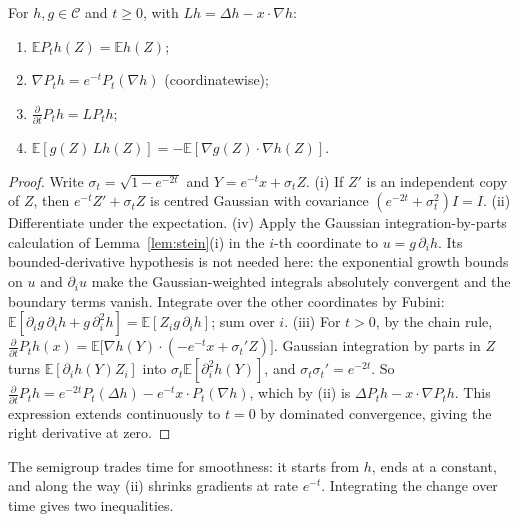 \begin{lemma}\label{lem:ou}
For $h,g\in\mathcal C$ and $t\ge0$, with $Lh=\Delta h-x\cdot\nabla h$:
\begin{enumerate}[label=(\roman*)]
\item $\mathbb EP_th(Z)=\mathbb Eh(Z)$;
\item $\nabla P_th=e^{-t}P_t(\nabla h)$ (coordinatewise);
\item $\frac{\partial}{\partial t}P_th=LP_th$;
\item $\mathbb E[g(Z)\,Lh(Z)]=-\mathbb E[\nabla g(Z)\cdot\nabla h(Z)]$.
\end{enumerate}
\end{lemma}
\begin{proof}
Write $\sigma_t=\sqrt{1-e^{-2t}}$ and $Y=e^{-t}x+\sigma_tZ$. (i) If $Z'$ is an independent copy of $Z$, then $e^{-t}Z'+\sigma_tZ$ is centred Gaussian with covariance $(e^{-2t}+\sigma_t^2)I=I$.
(ii) Differentiate under the expectation. (iv) Apply the Gaussian integration-by-parts calculation of Lemma~\ref{lem:stein}(i) in the $i$-th coordinate to $u=g\,\partial_ih$. Its bounded-derivative hypothesis is not needed here: the exponential growth bounds on $u$ and $\partial_i u$ make the Gaussian-weighted integrals absolutely convergent and the boundary terms vanish. Integrate over the other coordinates by Fubini:
$\mathbb E[\partial_ig\,\partial_ih+g\,\partial_i^2h]=\mathbb E[Z_ig\,\partial_ih]$; sum over $i$. (iii) For $t>0$, by the chain rule, $\frac{\partial}{\partial t}P_th(x)=\mathbb E\bigl[\nabla h(Y)\cdot(-e^{-t}x+\sigma_t'Z)\bigr]$.
Gaussian integration by parts in $Z$ turns $\mathbb E[\partial_ih(Y)Z_i]$ into $\sigma_t\mathbb E[\partial_i^2h(Y)]$, and $\sigma_t\sigma_t'=e^{-2t}$. So
$\frac{\partial}{\partial t}P_th=e^{-2t}P_t(\Delta h)-e^{-t}x\cdot P_t(\nabla h)$, which by (ii) is $\Delta P_th-x\cdot\nabla P_th$. This expression extends continuously to $t=0$ by dominated convergence, giving the right derivative at zero.
\end{proof}

The semigroup trades time for smoothness: it starts from $h$, ends at a constant, and along the way (ii) shrinks gradients at rate $e^{-t}$. Integrating the change
over time gives two inequalities.

